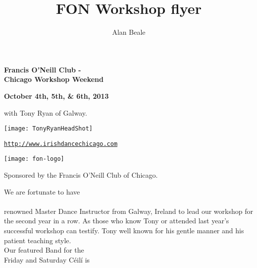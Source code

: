 \documentclass[12pt,
letterpaper]{leaflet}
\title{FON Workshop flyer}
\author{Alan Beale}
\date{}
\begin{document}
\begin{center}
{\Large\textbf{Francis O'Neill Club - \\ Chicago Workshop Weekend}}\\ 
\end{center}

\begin{center}
\textbf{October 4th, 5th, \&  6th, 2013} 


\vspace*{0.25em}
with Tony Ryan of Galway.
\end{center}

\vspace*{0.45em}
\begin{center}
\texttt{[image: TonyRyanHeadShot]}
\end{center}

\begin{center}
\vspace*{1.5em}
{\small \href{http://www.irishdancechicago.com}{\tt http://www.irishdancechicago.com} }

\vspace*{0.45em}
\begin{center}
\texttt{[image: fon-logo]}
\end{center}


{\small Sponsored by the Francis O'Neill Club of Chicago.}
\end{center}


\pagebreak
\begin{center}
We are fortunate to have \\
\\
\vspace*{1em}renowned Master Dance Instructor from Galway, Ireland to
lead our workshop for the second year in a row. As those who know
Tony or attended last year's successful workshop can testify. Tony well
known for his gentle manner and his patient teaching style. \\

\vspace*{4em}
Our featured Band for the \\Friday and Saturday C\'{e}il\'{i} is \\
\end{center}
\pagebreak
\end{document}
